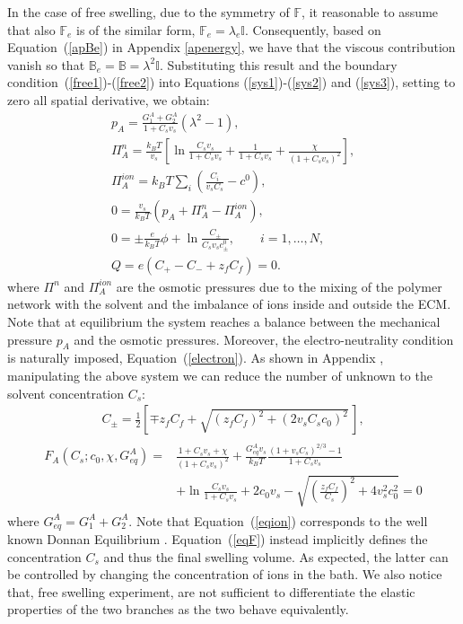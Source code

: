 \documentclass[runningheads]{llncs}
\newcommand{\F}{\ensuremath{\mathbb{F}}}
\newcommand{\B}{\ensuremath{\mathbb{B}}}
\begin{document}
In the case of free swelling, due to the symmetry of $\F$, it reasonable to assume that also $\F_e$ is of the similar form, $\F_e=\lambda_e \mathbb{I}$. Consequently, based on Equation~(\ref{apBe}) in Appendix \ref{apenergy}, we have that the viscous contribution vanish so that $\B_e=\B= \lambda^2 \mathbb{I}$. Substituting this result and the boundary condition~(\ref{free1})-(\ref{free2}) into Equations (\ref{sys1})-(\ref{sys2}) and (\ref{sys3}), setting to zero all spatial derivative, we obtain:
\begin{gather}
p_A = \frac{G^A_1+G^A_2}{1+C_sv_s}(\lambda^2-1),\label{presA}\\
\Pi^{n}_A = \frac{k_BT}{v_s} \left[\ln \frac{C_s v_s}{1+C_s v_s} + \frac{1}{1+C_sv_s} +\frac{\chi}{(1+C_s v_s)^2}\right],\\
\Pi^{ion}_A = k_B T \sum_i \left(\frac{C_i}{v_sC_s}-c^0\right),\\
0 = \frac{v_s}{k_BT} (p_A+\Pi^{n}_A-\Pi^{ion}_A), \\[2mm]
0 = \pm\frac{e}{k_B T} \phi  + \ln \frac{C_\pm}{C_s v_s c_\pm^0},\qquad i=1,\ldots,N,\\[2.5mm]
Q = e\left(C_+-C_-+z_f C_{f}\right)=0.\label{electron}
\end{gather}
where $\Pi^{n}$ and $\Pi^{ion}_A$ are the osmotic pressures due to the mixing of the polymer network with the solvent and the imbalance of ions inside and outside the ECM. 
Note that at equilibrium the system reaches a balance between the mechanical pressure $p_A$ and the osmotic pressures. Moreover, the electro-neutrality condition is naturally imposed, Equation~(\ref{electron}). As shown in Appendix , manipulating the above system we can reduce the number of unknown to the solvent concentration $C_s$:
\begin{gather}
C_{\pm}= \frac{1}{2}\left[\mp z_fC_f+ \sqrt{(z_fC_f)^2+(2v_sC_sc_0)^2}\,\right],\label{eqion}
\end{gather}
\begin{gather}
\begin{aligned}
F_{A}(C_s; c_0,\chi,G^A_{eq})=&\frac{1+C_sv_s+\chi}{(1+C_sv_s)^2}+\frac{G^A_{eq} v_s}{k_BT} \frac{(1+v_sC_s)^{2/3}-1}{1+C_sv_s}\\[1.5mm]
&+\ln \frac{C_sv_s}{1+C_sv_s} +2c_0v_s-\sqrt{\left(\frac{z_fC_f}{C_s}\right)^2+4v_s^2c^2_0} =0 \label{eqF}
\end{aligned}
\end{gather}
where $G^A_{eq}=G^A_1+G^A_2$. Note that Equation~(\ref{eqion}) corresponds to the well known Donnan Equilibrium \cite{DROZDOVph}. Equation~(\ref{eqF}) instead implicitly defines the concentration $C_s$ and thus the final swelling volume. As expected, the latter can be controlled by changing the concentration of ions in the bath. We also notice that, free swelling experiment, are not sufficient to differentiate the elastic properties of the two branches as the two behave equivalently.
\end{document}
